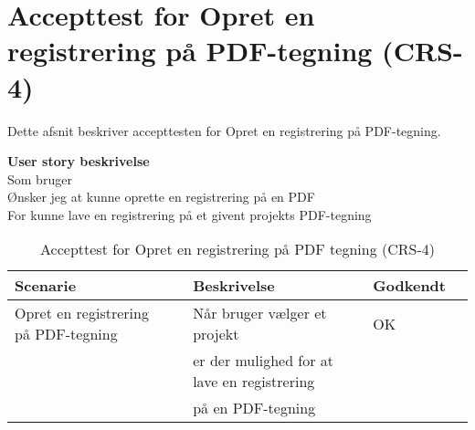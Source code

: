 \section{Accepttest for Opret en registrering på PDF-tegning (CRS-4)}
Dette afsnit beskriver accepttesten for Opret en registrering på PDF-tegning.

\textbf{User story beskrivelse} \\
Som bruger \\
Ønsker jeg at kunne oprette en registrering på en PDF \\
For kunne lave en registrering på et givent projekts PDF-tegning

\begin{table}[H]
	\centering
	\begin{tabular}{|ll|l|ll|} \hline
		\textbf{Scenarie} &  & \textbf{Beskrivelse}&  \textbf{Godkendt}&  \\ \hline
		Opret en registrering på PDF-tegning&  &  Når bruger vælger et projekt &  OK&  \\
		& & er der mulighed for at lave en registrering& & \\ 
			& & på en PDF-tegning& & \\ \hline
	\end{tabular}
	\caption{Accepttest for Opret en registrering på PDF tegning (CRS-4)}
	\label{AcceptPDF}
\end{table}

\clearpage